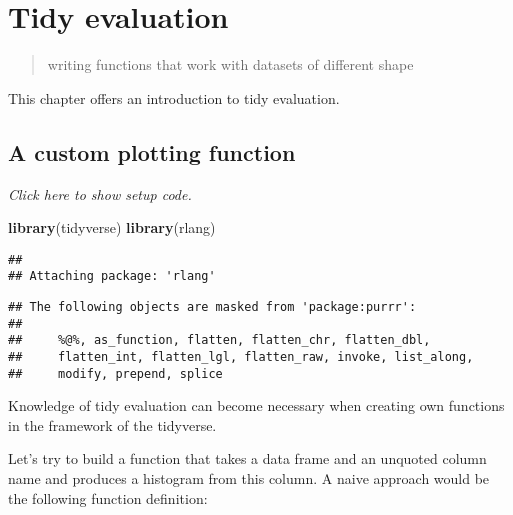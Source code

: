 \documentclass[]{book}
\newenvironment{Shaded}{\begin{snugshade}}{\end{snugshade}}
\newcommand{\ControlFlowTok}[1]{\textcolor[rgb]{0.13,0.29,0.53}{\textbf{#1}}}
\newcommand{\DataTypeTok}[1]{\textcolor[rgb]{0.13,0.29,0.53}{#1}}
\newcommand{\KeywordTok}[1]{\textcolor[rgb]{0.13,0.29,0.53}{\textbf{#1}}}
\newcommand{\NormalTok}[1]{#1}
\newcommand{\OperatorTok}[1]{\textcolor[rgb]{0.81,0.36,0.00}{\textbf{#1}}}
\newcommand{\StringTok}[1]{\textcolor[rgb]{0.31,0.60,0.02}{#1}}
\begin{document}
\hypertarget{tidy-evaluation}{%
\chapter{Tidy evaluation}\label{tidy-evaluation}}

\begin{quote}
writing functions that work with datasets of different shape
\end{quote}

This chapter offers an introduction to tidy evaluation.

\hypertarget{colname}{%
\section{A custom plotting function}\label{colname}}

\emph{Click here to show setup code.}

\begin{Shaded}
\begin{Highlighting}[]
\KeywordTok{library}\NormalTok{(tidyverse)}
\KeywordTok{library}\NormalTok{(rlang)}
\end{Highlighting}
\end{Shaded}

\begin{verbatim}
## 
## Attaching package: 'rlang'
\end{verbatim}

\begin{verbatim}
## The following objects are masked from 'package:purrr':
## 
##     %@%, as_function, flatten, flatten_chr, flatten_dbl,
##     flatten_int, flatten_lgl, flatten_raw, invoke, list_along,
##     modify, prepend, splice
\end{verbatim}

Knowledge of tidy evaluation can become necessary when creating own functions in the framework of the tidyverse.

Let's try to build a function that takes a data frame and an unquoted column name and produces a histogram from this column.
A naive approach would be the following function definition:

\begin{Shaded}
\end{Shaded}
\end{document}
